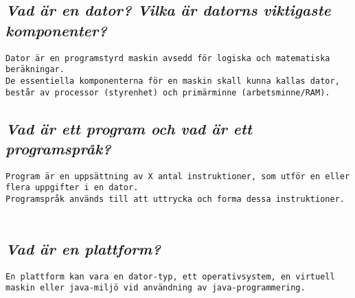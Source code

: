 \documentclass[../main.tex]{subfiles}
\begin{document}
\subsection{\textit{Vad är en dator? Vilka är datorns viktigaste komponenter?}}
\texttt{Dator är en programstyrd maskin avsedd för logiska och matematiska beräkningar.\\ De essentiella komponenterna för en maskin skall kunna kallas dator, består av processor (styrenhet) och primärminne (arbetsminne/RAM).}

\subsection{\textit{Vad är ett program och vad är ett programspråk?}}
\texttt{Program är en uppsättning av X antal instruktioner, som utför en eller flera uppgifter i en dator. \\ Programspråk används till att uttrycka och forma dessa instruktioner.}\\
\\
\subsection{\textit{Vad är en plattform?}}
\texttt{En plattform kan vara en dator-typ, ett operativsystem, en virtuell maskin eller java-miljö vid användning av java-programmering.}
\end{document}
